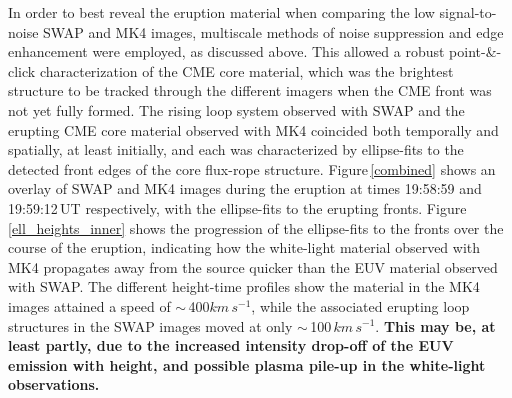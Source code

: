 \documentclass[namedreferences]{solarphysics}
\begin{document}
\begin{article}
In order to best reveal the eruption material when comparing the low signal-to-noise SWAP and MK4 images, multiscale methods of noise suppression and edge enhancement were employed, as discussed above. This allowed a robust point-\&-click characterization of the CME core material, which was the brightest structure to be tracked through the different imagers when the CME front was not yet fully formed. The rising loop system observed with SWAP and the erupting CME core material observed with MK4 coincided both temporally and spatially, at least initially, and each was characterized by ellipse-fits to the detected front edges of the core flux-rope structure. Figure\,\ref{combined} shows an overlay of SWAP and MK4 images during the eruption at times 19:58:59 and 19:59:12\,UT respectively, with the ellipse-fits to the erupting fronts. Figure\,\ref{ell_heights_inner} shows the progression of the ellipse-fits to the fronts over the course of the eruption, indicating how the white-light material observed with MK4 propagates away from the source quicker than the EUV material observed with SWAP. The different height-time profiles show the material in the MK4 images attained a speed of $\sim$\,400$km\,s^{-1}$, while the associated erupting loop structures in the SWAP images moved at only $\sim$\,100$\,km\,s^{-1}$. {\bf This may be, at least partly, due to the increased intensity drop-off of the EUV emission with height, and possible plasma pile-up in the white-light observations.} %



\end{article}
\end{document}
